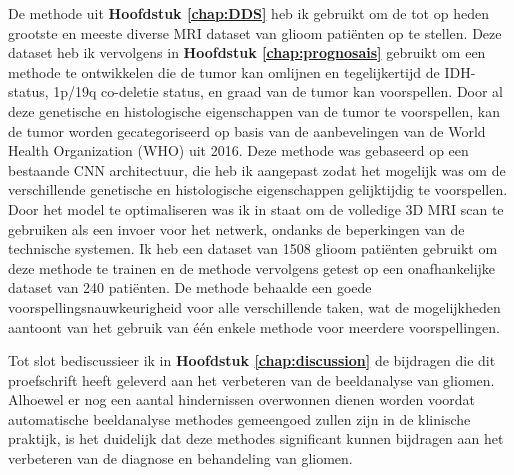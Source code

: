 De methode uit \textbf{Hoofdstuk \ref{chap:DDS}} heb ik gebruikt om de tot op heden grootste en meeste diverse MRI dataset van glioom pati{\"e}nten op te stellen.
Deze dataset heb ik vervolgens in \textbf{Hoofdstuk \ref{chap:prognosais}} gebruikt om een methode te ontwikkelen die de tumor kan omlijnen en tegelijkertijd de IDH-status, 1p/19q co-deletie status, en graad van de tumor kan voorspellen.
Door al deze genetische en histologische eigenschappen van de tumor te voorspellen, kan de tumor worden gecategoriseerd op basis van de aanbevelingen van de World Health Organization (WHO) uit 2016.
Deze methode was gebaseerd op een bestaande CNN architectuur, die heb ik aangepast zodat het mogelijk was om de verschillende genetische en histologische eigenschappen gelijktijdig te voorspellen.
Door het model te optimaliseren was ik in staat om de volledige 3D MRI scan te gebruiken als een invoer voor het netwerk, ondanks de beperkingen van de technische systemen.
Ik heb een dataset van 1508 glioom pati{\"e}nten gebruikt om deze methode te trainen en de methode vervolgens getest op een onafhankelijke dataset van 240 pati{\"e}nten.
De methode behaalde een goede voorspellingsnauwkeurigheid voor alle verschillende taken, wat de mogelijkheden aantoont van het gebruik van {\'e}{\'e}n enkele methode voor meerdere voorspellingen.

Tot slot bediscussieer ik in \textbf{Hoofdstuk \ref{chap:discussion}} de bijdragen die dit proefschrift heeft geleverd aan het verbeteren van de beeldanalyse van gliomen.
Alhoewel er nog een aantal hindernissen overwonnen dienen worden voordat automatische beeldanalyse methodes gemeengoed zullen zijn in de klinische praktijk, is het duidelijk dat deze methodes significant kunnen bijdragen aan het verbeteren van de diagnose en behandeling van gliomen.


